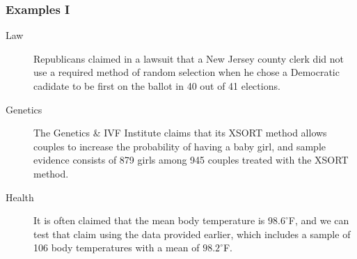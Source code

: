 \documentclass[xcolor=dvipsnames]{beamer}
\begin{document}
\begin{frame}
\end{frame}

\begin{frame}
  \frametitle{Examples I}
  \begin{description}
  \item[Law] Republicans claimed in a lawsuit that a New Jersey county
    clerk did not use a required method of random selection when he
    chose a Democratic cadidate to be first on the ballot in 40 out of
    41 elections.
  \item[Genetics] The Genetics \& IVF Institute claims that its XSORT
    method allows couples to increase the probability of having a baby
    girl, and sample evidence consists of 879 girls among 945 couples
    treated with the XSORT method.
  \item[Health] It is often claimed that the mean body temperature is
    $98.6^{\circ}$F, and we can test that claim using the data
    provided earlier, which includes a sample of 106 body temperatures
    with a mean of $98.2^{\circ}$F.
  \end{description}
\end{frame}
\end{document}
